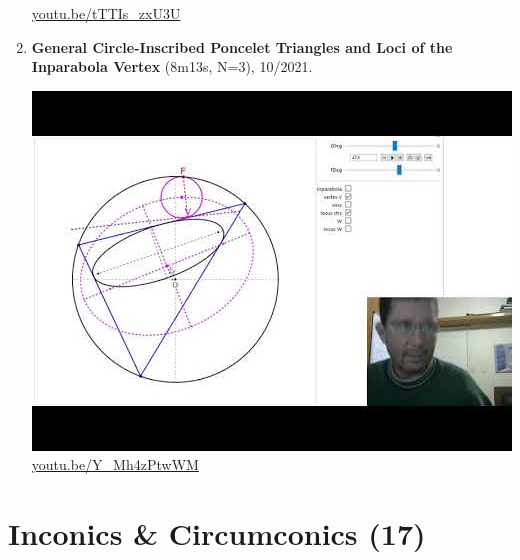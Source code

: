 \documentclass[12pt]{amsart}
\begin{document}
\begin{enumerate}[resume]
\begin{center}
\href{https://youtu.be/tTTIs_zxU3U}{\url{youtu.be/tTTIs\_zxU3U}}\end{center}
% 
\item \textbf{General Circle-Inscribed Poncelet Triangles and Loci of the Inparabola Vertex} (8m13s, N=3), 10/2021. 
\begin{center}\includegraphics[width=.5\textwidth]{pics/Y_Mh4zPtwWM.jpg} \\ 
\href{https://youtu.be/Y_Mh4zPtwWM}{\url{youtu.be/Y\_Mh4zPtwWM}}\end{center}
% 
\end{enumerate}

\section{Inconics \& Circumconics (17)}
\end{document}
